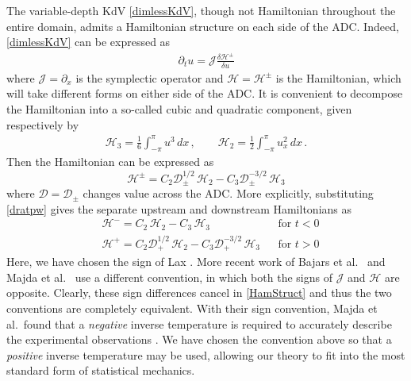\documentclass[11pt]{article}
\newcommand{\pdi}[2] { {\partial_#2} #1 }
\newcommand{\dx}{\, dx}
\newcommand{\drat}{\mathcal{D}}
\newcommand{\dratdn}{\drat_+}
\newcommand{\dratupdn}{\drat_{\pm}}
\newcommand{\sympJ}{\mathcal{J}}
\newcommand{\vard}[2]{\frac{\delta #1}{\delta #2}}
\newcommand{\Ham}{\mathcal{H}}
\newcommand{\Hup}{\Ham^{-}}
\newcommand{\Hdn}{\Ham^{+}}
\newcommand{\Hupdn}{\Ham^{\pm}}
\newcommand{\Hthree}{\Ham_{3}}
\newcommand{\Htwo}{\Ham_{2}}
\begin{document}
The variable-depth KdV \eqref{dimlessKdV}, though not Hamiltonian throughout the entire domain, admits a Hamiltonian structure on each side of the ADC. Indeed, \eqref{dimlessKdV} can be expressed as
\begin{align}
\label{HamStruct}
\partial_t{u} = \sympJ \vard{\Hupdn}{u}
\end{align}
where $\sympJ = \pdi{}{x}$ is the symplectic operator and $\Ham = \Hupdn$ is the Hamiltonian, which will take different forms on either side of the ADC. It is convenient to decompose the Hamiltonian into a so-called cubic and quadratic component, given respectively by
\begin{align}
\label{H3H2}
\Hthree = \frac{1}{6} \int_{-\pi}^{\pi} u^3 \dx	\, , \qquad
\Htwo = \frac{1}{2} \int_{-\pi}^{\pi} u_x^2 \dx	\, .
\end{align}
Then the Hamiltonian can be expressed as
\begin{equation}
\label{Hamiltonian}
\Hupdn = C_2 \dratupdn^{1/2} \, \Htwo - C_3 \dratupdn^{-3/2} \, \Hthree
\end{equation}
where $\drat = \dratupdn$ changes value across the ADC. More explicitly, substituting \eqref{dratpw} gives the separate upstream and downstream Hamiltonians as
\begin{align}
&\Hup = C_2 \, \Htwo - C_3 \, \Hthree 						&& \text{for } t<0 \\
&\Hdn = C_2 \dratdn^{1/2} \, \Htwo - C_3 \dratdn^{-3/2} \, \Hthree	&& \text{for } t>0
\end{align}
Here, we have chosen the sign of Lax \cite{lax1975periodic}. More recent work of Bajars et al.~\cite{bajars2013weakly} and Majda et al.~\cite{majda2019} use a different convention, in which both the signs of $\sympJ$ and $\Ham$ are opposite. Clearly, these sign differences cancel in \eqref{HamStruct} and thus the two conventions are completely equivalent. With their sign convention, Majda et al.~found that a {\em negative} inverse temperature is required to accurately describe the experimental observations \cite{majda2019}. We have  chosen the convention above so that a {\em positive} inverse temperature may be used, allowing our theory to fit into the most standard form of statistical mechanics.

\end{document}
